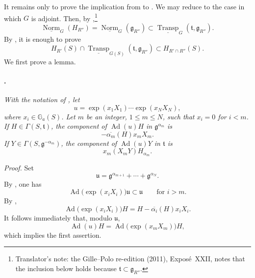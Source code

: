 It remains only to prove the implication from \textup{} to
\textup{}. We may reduce to the case in which \(G\) is adjoint.
Then, by ,\footnote{Translator's note: the Gille--Polo re-edition (2011), Exposé~XXII, notes that
the inclusion below holds because \(\mathfrak t\subset\mathfrak g_{R''}\).}
\[
  \underline{\operatorname{Norm}}_G(H_{R''})
  =
  \underline{\operatorname{Norm}}_G(\mathfrak g_{R''})
  \subset
  \underline{\operatorname{Transp}}_G
    (\mathfrak t,\mathfrak g_{R''}).
\]
By , it is enough to prove
\[
  H_{R'}(S)\cap
  \underline{\operatorname{Transp}}_{G(S)}
    (\mathfrak t,\mathfrak g_{R''})
  \subset
  H_{R'\cap R''}(S).
  \tag{x}\label{sga3:xxii:subsection:5-6:equation:x}
\]
We first prove a lemma.

\paragraph{.}
\textit{With the notation of , let}
\[
  u=\exp(x_1X_1)\cdots\exp(x_NX_N),
\]
\textit{where \(x_i\in\mathbb G_a(S)\). Let \(m\) be an integer,
\(1\leq m\leq N\), such that \(x_i=0\) for \(i<m\).
If \(H\in\Gamma(S,\mathfrak t)\), the component of
\(\operatorname{Ad}(u)H\) in \(\mathfrak g^{\alpha_m}\) is}
\[
  -\overline{\alpha_m}(H)x_mX_m.
\]
\textit{If \(Y\in\Gamma(S,\mathfrak g^{-\alpha_m})\), the component
of \(\operatorname{Ad}(u)Y\) in \(\mathfrak t\) is}
\[
  x_m(X_mY)H_{\alpha_m}.
\]

\textit{Proof.}
Set
\[
  \mathfrak u
  =
  \mathfrak g^{\alpha_{m+1}}+\cdots+\mathfrak g^{\alpha_N}.
\]
By , one has
\[
  \operatorname{Ad}\bigl(\exp(x_iX_i)\bigr)\mathfrak u
  \subset\mathfrak u
  \qquad\text{for }i>m.
\]
By ,
\[
  \operatorname{Ad}\bigl(\exp(x_iX_i)\bigr)H
  =
  H-\overline{\alpha_i}(H)x_iX_i.
\]
It follows immediately that, modulo \(\mathfrak u\),
\[
  \operatorname{Ad}(u)H
  =
  \operatorname{Ad}\bigl(\exp(x_mX_m)\bigr)H,
\]
which implies the first assertion.

